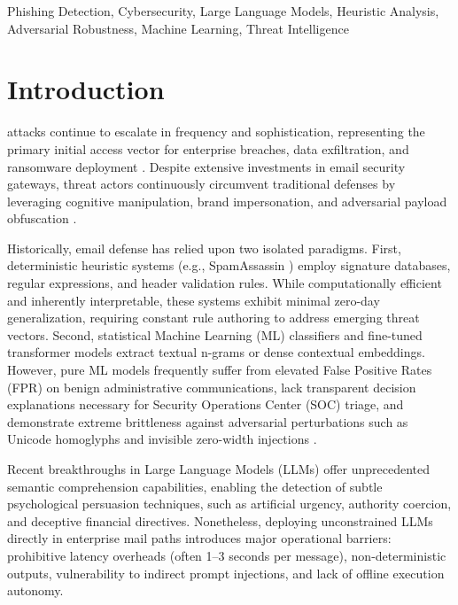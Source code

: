 \documentclass{ieeeaccess}
\begin{document}
\begin{keywords}
Phishing Detection, Cybersecurity, Large Language Models, Heuristic Analysis, Adversarial Robustness, Machine Learning, Threat Intelligence
\end{keywords}

\titlepgskip=-15pt

\maketitle

\section{Introduction}
\label{sec:introduction}
 attacks continue to escalate in frequency and sophistication, representing the primary initial access vector for enterprise breaches, data exfiltration, and ransomware deployment \cite{b1, b2}. Despite extensive investments in email security gateways, threat actors continuously circumvent traditional defenses by leveraging cognitive manipulation, brand impersonation, and adversarial payload obfuscation \cite{b8}. 

Historically, email defense has relied upon two isolated paradigms. First, deterministic heuristic systems (e.g., SpamAssassin \cite{b4}) employ signature databases, regular expressions, and header validation rules. While computationally efficient and inherently interpretable, these systems exhibit minimal zero-day generalization, requiring constant rule authoring to address emerging threat vectors. Second, statistical Machine Learning (ML) classifiers \cite{b2} and fine-tuned transformer models \cite{b7} extract textual n-grams or dense contextual embeddings. However, pure ML models frequently suffer from elevated False Positive Rates (FPR) on benign administrative communications, lack transparent decision explanations necessary for Security Operations Center (SOC) triage, and demonstrate extreme brittleness against adversarial perturbations such as Unicode homoglyphs and invisible zero-width injections \cite{b9}.

Recent breakthroughs in Large Language Models (LLMs) \cite{b10} offer unprecedented semantic comprehension capabilities, enabling the detection of subtle psychological persuasion techniques, such as artificial urgency, authority coercion, and deceptive financial directives. Nonetheless, deploying unconstrained LLMs directly in enterprise mail paths introduces major operational barriers: prohibitive latency overheads (often 1--3 seconds per message), non-deterministic outputs, vulnerability to indirect prompt injections, and lack of offline execution autonomy.
\end{document}
